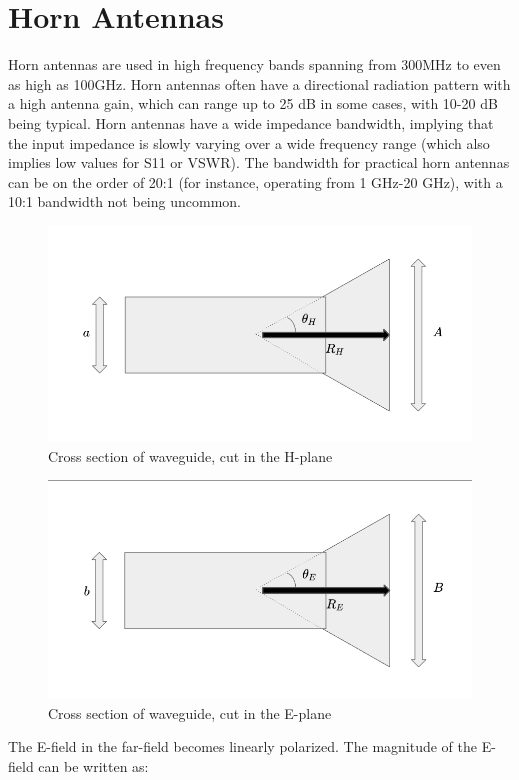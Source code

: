 \documentclass[a4paper,12pt]{report}
\begin{document}
\section{Horn Antennas}

Horn antennas are used in high frequency bands spanning from 300MHz
to even as high as 100GHz.
Horn antennas often have a directional radiation pattern with a high antenna gain,
which can range up to 25 dB in some cases, with 10-20 dB being typical.
Horn antennas have a wide impedance bandwidth,
implying that the input impedance is slowly varying over a wide frequency range (which also implies low values for S11 or VSWR). The bandwidth for practical horn antennas can be on the order of 20:1 (for instance, operating from 1 GHz-20 GHz),
with a 10:1 bandwidth not being uncommon.

\begin{figure}
  \begin{center}
    \includegraphics[clip, keepaspectratio, width=0.5\linewidth]{img/horn_antenna_h_plane_cross_section.png}
    \caption{Cross section of waveguide, cut in the H-plane}
    \label{fig:horn_antenna_h_plane_cross_section}
  \end{center}
\end{figure}

\begin{figure}
  \begin{center}
    \includegraphics[clip, keepaspectratio, width=0.5\linewidth]{img/horn_antenna_e_plane_cross_section.png}
    \caption{Cross section of waveguide, cut in the E-plane}
    \label{fig:horn_antenna_e_plane_cross_section}
  \end{center}
\end{figure}

The E-field in the far-field becomes linearly polarized.
The magnitude of the E-field can be written as:
\end{document}
